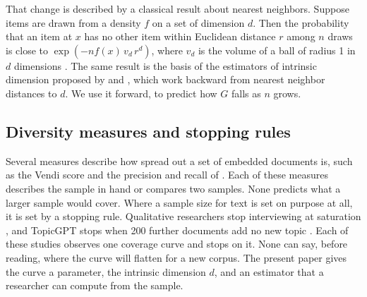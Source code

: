 That change is described by a classical result about nearest neighbors. Suppose items are drawn from a density $f$ on a set of dimension $d$. Then the probability that an item at $x$ has no other item within Euclidean distance $r$ among $n$ draws is close to $\exp(-n f(x)\, v_d\, r^{d})$, where $v_d$ is the volume of a ball of radius 1 in $d$ dimensions \citep{evans2002,penrose2003rgg}. The same result is the basis of the estimators of intrinsic dimension proposed by \citet{levina2005} and \citet{facco2017twonn}, which work backward from nearest neighbor distances to $d$. We use it forward, to predict how $G$ falls as $n$ grows.

\subsection{Diversity measures and stopping rules}

Several measures describe how spread out a set of embedded documents is, such as the Vendi score \citep{friedman2023vendi} and the precision and recall of \citet{kynkaanniemi2019}. Each of these measures describes the sample in hand or compares two samples. None predicts what a larger sample would cover. Where a sample size for text is set on purpose at all, it is set by a stopping rule. Qualitative researchers stop interviewing at saturation \citep{guest2006,hennink2022}, and TopicGPT stops when 200 further documents add no new topic \citep{pham2024topicgpt}. Each of these studies observes one coverage curve and stops on it. None can say, before reading, where the curve will flatten for a new corpus. The present paper gives the curve a parameter, the intrinsic dimension $d$, and an estimator that a researcher can compute from the sample.
